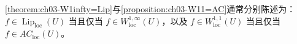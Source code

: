 \documentclass[../../main.tex]{subfiles}%
\begin{document}
\cref{theorem:ch03-W1infty=Lip}与\cref{proposition:ch03-W11=AC}通常分别陈述为：$f\in\operatorname{Lip}_{\mathrm{loc}}(U)$ 当且仅当 $f\in W^{1,\infty}_{\mathrm{loc}}(U)$，以及 $f\in W^{1,1}_{\mathrm{loc}}(U)$ 当且仅当 $f\in AC_{\mathrm{loc}}(U)$。


\end{document}

